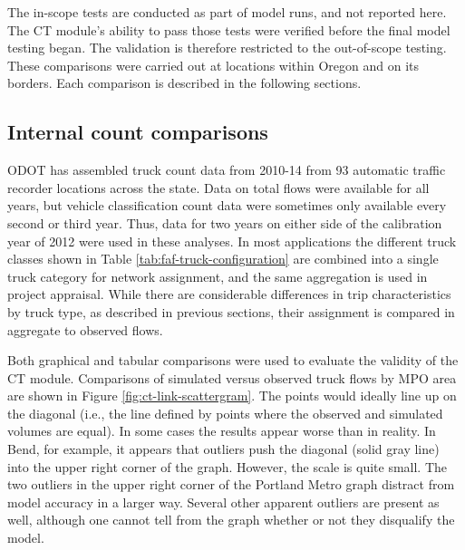 The in-scope tests are conducted as part of model runs, and not reported here. The CT module's ability to pass those tests were verified before the final model testing began. The validation is therefore restricted to the out-of-scope testing. These comparisons were carried out at locations within Oregon and on its borders. Each comparison is described in the following sections.

\subsection{Internal count comparisons}
ODOT has assembled truck count data from 2010-14 from 93 automatic traffic recorder locations across the state. Data on total flows were available for all years, but vehicle classification count data were sometimes only available every second or third year. Thus, data for two years on either side of the calibration year of 2012 were used in these analyses. In most applications the different truck classes shown in Table \ref{tab:faf-truck-configuration} are combined into a single truck category for network assignment, and the same aggregation is used in project appraisal. While there are considerable differences in trip characteristics by truck type, as described in previous sections, their assignment is compared in aggregate to observed flows. 

Both graphical and tabular comparisons were used to evaluate the validity of the CT module. Comparisons of simulated versus observed truck flows by MPO area are shown in Figure \ref{fig:ct-link-scattergram}. The points would ideally line up on the diagonal (i.e., the line defined by points where the observed and simulated volumes are equal). In some cases the results appear worse than in reality. In Bend, for example, it appears that outliers push the diagonal (solid gray line) into the upper right corner of the graph. However, the scale is quite small. The two outliers in the upper right corner of the Portland Metro graph distract from model accuracy in a larger way. Several other apparent outliers are present as well, although one cannot tell from the graph whether or not they disqualify the model. 

